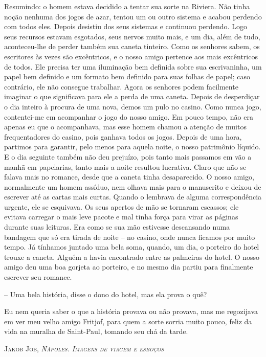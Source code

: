 Resumindo: o homem estava decidido a tentar sua sorte na Riviera. Não
tinha noção nenhuma dos jogos de azar, tentou um ou outro sistema e
acabou perdendo com todos eles. Depois desistiu dos seus sistemas e
continuou perdendo. Logo seus recursos estavam esgotados, seus nervos
muito mais, e um dia, além de tudo, aconteceu-lhe de perder também sua
caneta tinteiro. Como os senhores sabem, os escritores às vezes são
excêntricos, e o nosso amigo pertence aos mais excêntricos de todos. Ele
precisa ter uma iluminação bem definida sobre sua escrivaninha, um papel
bem definido e um formato bem definido para suas folhas de papel; caso
contrário, ele não consegue trabalhar. Agora os senhores podem
facilmente imaginar o que significava para ele a perda de uma caneta.
Depois de desperdiçar o dia inteiro à procura de uma nova, demos um pulo
no casino. Como nunca jogo, contentei-me em acompanhar o jogo do nosso
amigo. Em pouco tempo, não era apenas eu que o acompanhava, mas esse
homem chamou a atenção de muitos frequentadores do casino, pois ganhava
todos os jogos. Depois de uma hora, partimos para garantir, pelo menos
para aquela noite, o nosso patrimônio líquido. E o dia seguinte também
não deu prejuízo, pois tanto mais passamos em vão a manhã em papelarias,
tanto mais a noite resultou lucrativa. Claro que não se falava mais no
romance, desde que a caneta tinha desaparecido. O nosso amigo,
normalmente um homem assíduo, nem olhava mais para o manuscrito e deixou
de escrever até as cartas mais curtas. Quando o lembrava de alguma
correspondência urgente, ele se esquivava. Os seus apertos de mão se
tornaram escassos; ele evitava carregar o mais leve pacote e mal tinha
força para virar as páginas durante suas leituras. Era como se sua mão
estivesse descansando numa bandagem que só era tirada de noite -- no
casino, onde nunca ficamos por muito tempo. Já tínhamos juntado uma bela
soma, quando, um dia, o porteiro do hotel trouxe a caneta. Alguém a
havia encontrado entre as palmeiras do hotel. O nosso amigo deu uma boa
gorjeta ao porteiro, e no mesmo dia partiu para finalmente escrever seu
romance.

-- Uma bela história, disse o dono do hotel, mas ela prova o quê?

Eu nem queria saber o que a história provava ou não provava, mas me
regozijava em ver meu velho amigo Fritjof, para quem a sorte sorria
muito pouco, feliz da vida na muralha de Saint-Paul, tomando seu chá da
tarde.

\textsc{Jakob Job, \emph{Nápoles. Imagens de viagem e esboços }}

